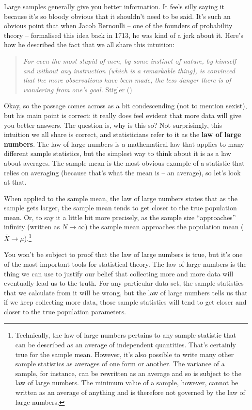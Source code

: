 \documentclass[
  11pt,
  a4paper,
  twoside,symmetric,openright]{book}
\theoremstyle{break}
\theoremstyle{break}
\begin{document}
Large samples generally give you better information. It feels silly saying it because it's so bloody obvious that it shouldn't need to be said. It's such an obvious point that when Jacob Bernoulli -- one of the founders of probability theory -- formalised this idea back in 1713, he was kind of a jerk about it. Here's how he described the fact that we all share this intuition:

\begin{quote}
\emph{For even the most stupid of men, by some instinct of nature, by himself and without any instruction (which is a remarkable thing), is convinced that the more observations have been made, the less danger there is of wandering from one's goal.} Stigler ()
\end{quote}

Okay, so the passage comes across as a bit condescending (not to mention sexist), but his main point is correct: it really does feel evident that more data will give you better answers. The question is, why is this so? Not surprisingly, this intuition we all share is correct, and statisticians refer to it as the \textbf{law of large numbers}. The law of large numbers is a mathematical law that applies to many different sample statistics, but the simplest way to think about it is as a law about averages. The sample mean is the most obvious example of a statistic that relies on averaging (because that's what the mean is -- an average), so let's look at that.

When applied to the sample mean, the law of large numbers states that as the sample gets larger, the sample mean tends to get closer to the true population mean. Or, to say it a little bit more precisely, as the sample size ``approaches'' infinity (written as \(N \rightarrow \infty\)) the sample mean approaches the population mean (\(\bar{X} \rightarrow \mu\)).\footnote{Technically, the law of large numbers pertains to any sample statistic that can be described as an average of independent quantities. That's certainly true for the sample mean. However, it's also possible to write many other sample statistics as averages of one form or another. The variance of a sample, for instance, can be rewritten as an average and so is subject to the law of large numbers. The minimum value of a sample, however, cannot be written as an average of anything and is therefore not governed by the law of large numbers.}

You won't be subject to proof that the law of large numbers is true, but it's one of the most important tools for statistical theory. The law of large numbers is the thing we can use to justify our belief that collecting more and more data will eventually lead us to the truth. For any particular data set, the sample statistics that we calculate from it will be wrong, but the law of large numbers tells us that if we keep collecting more data, those sample statistics will tend to get closer and closer to the true population parameters.
\end{document}

